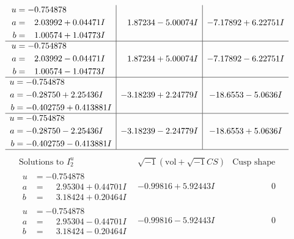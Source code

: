\documentclass[1p]{elsarticle_modified}
\theoremstyle{definition}
\newcommand{\I}{\sqrt{-1}}
\begin{document}
$$\begin{array}{c|c|c}
\begin{aligned}
u &= -0.754878\phantom{ +0.000000I} \\
a &= \phantom{-}2.03992 + 0.04471 I \\
b &= \phantom{-}1.00574 + 1.04773 I\end{aligned}
 & \phantom{-}1.87234 - 5.00074 I & -7.17892 + 6.22751 I \\ \hline\begin{aligned}
u &= -0.754878\phantom{ +0.000000I} \\
a &= \phantom{-}2.03992 - 0.04471 I \\
b &= \phantom{-}1.00574 - 1.04773 I\end{aligned}
 & \phantom{-}1.87234 + 5.00074 I & -7.17892 - 6.22751 I \\ \hline\begin{aligned}
u &= -0.754878\phantom{ +0.000000I} \\
a &= -0.28750 + 2.25436 I \\
b &= -0.402759 + 0.413881 I\end{aligned}
 & -3.18239 + 2.24779 I & -18.6553 - 5.0636 I \\ \hline\begin{aligned}
u &= -0.754878\phantom{ +0.000000I} \\
a &= -0.28750 - 2.25436 I \\
b &= -0.402759 - 0.413881 I\end{aligned}
 & -3.18239 - 2.24779 I & -18.6553 + 5.0636 I\\
 \hline 
 \end{array}$$\newpage$$\begin{array}{c|c|c}  
\text{Solutions to }I^u_{2}& \I (\text{vol} + \sqrt{-1}CS) & \text{Cusp shape}\\
 \hline 
\begin{aligned}
u &= -0.754878\phantom{ +0.000000I} \\
a &= \phantom{-}2.95304 + 0.44701 I \\
b &= \phantom{-}3.18424 + 0.20464 I\end{aligned}
 & -0.99816 + 5.92443 I & \phantom{-0.000000 } 0 \\ \hline\begin{aligned}
u &= -0.754878\phantom{ +0.000000I} \\
a &= \phantom{-}2.95304 - 0.44701 I \\
b &= \phantom{-}3.18424 - 0.20464 I\end{aligned}
 & -0.99816 - 5.92443 I & \phantom{-0.000000 } 0 \\ \hline\begin{aligned}

\end{aligned}
\end{array}$$
\end{document}
